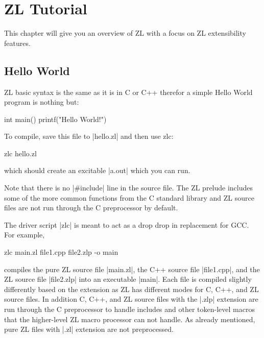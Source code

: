 

\chapter{ZL Tutorial}
\label{zl-tutorial}

This chapter will give you an overview of ZL with a focus on ZL
extensibility features.

\section{Hello World}

ZL basic syntax is the same as it is in C or C++ therefor a simple
Hello World program is nothing but:

\begin{code}
int main() {
  printf("Hello World!")
}
\end{code}

To compile, save this file to |hello.zl| and then use zlc:
\begin{code}
zlc hello.zl
\end{code}
which should create an excitable |a.out| which you can run.

Note that there is no |#include| line in the source file.  The ZL
prelude includes some of the more common functions from the C standard
library and ZL source files are not run through the C preprocessor
by default.

The driver script |zlc| is meant to act as a drop drop in replacement
for GCC.  For example,
\begin{code}
zlc main.zl file1.cpp file2.zlp -o main
\end{code}
compiles the pure ZL source file |main.zl|, the C++ source file
|file1.cpp|, and the ZL source file |file2.zlp| into an executable
|main|.  Each file is compiled slightly differently based on the
extension as ZL has different modes for C, C++, and ZL source files.
In addition C, C++, and ZL source files with the |.zlp| extension are
run through the C preprocessor to handle includes and other
token-level macros that the higher-level ZL macro processor can not
handle.  As already mentioned, pure ZL files with |.zl| extension are
not preprocessed.

